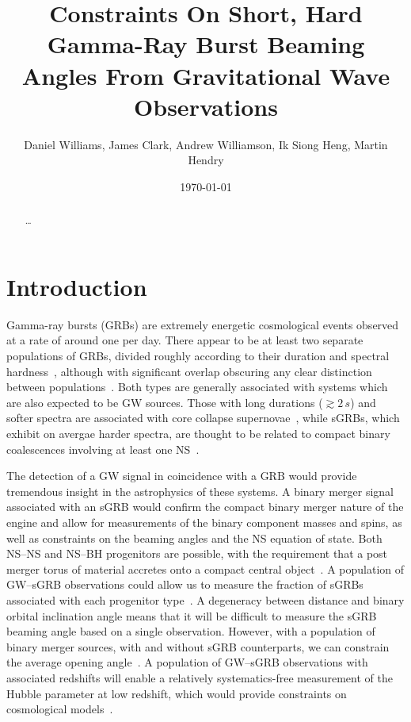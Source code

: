 \documentclass[twocolumn,nofootinbib]{revtex4-1}
\newcommand{\BNS}{\ac{NS}--\ac{NS}\xspace}
\newcommand{\NSBH}{\ac{NS}--\ac{BH}\xspace}
\newcommand{\JOINT}{\ac{GW}--\ac{sGRB}\xspace}
\begin{document}
\title{Constraints On Short, Hard Gamma-Ray Burst Beaming Angles From
Gravitational Wave Observations}
\author{Daniel Williams, James Clark, Andrew Williamson, Ik Siong Heng, Martin Hendry}
\date{\today}

\begin{abstract}
\dots
\end{abstract}

\maketitle

\section{Introduction}
Gamma-ray bursts (GRBs) are extremely energetic
cosmological events observed at a rate of around one per day.  There
appear to be at least two separate populations of \acp{GRB}, divided
roughly according to their duration and spectral
hardness~\cite{Kouveliotou:1993yx}, although with significant overlap
obscuring any clear distinction between
populations~\cite{Zhang:2009uf,Bromberg:2012gp}.  Both types are
generally associated with systems which are also expected to be
\ac{GW} sources.  Those with long durations ($\gtrsim 2\,s$) and
softer spectra are associated with core collapse
supernovae~\cite{Galama:1998ea,MacFadyen:1998vz,Woosley:2006fn}, while
\acp{sGRB}, which exhibit on avergae harder spectra, are thought to be
related to compact binary coalescences involving at least one
\ac{NS}~\cite{Eichler:1989ve,Paczynski:1991aq,Narayan:1992iy,Lee:2007js}.

The detection of a \ac{GW} signal in coincidence with a \ac{GRB} would
provide tremendous insight in the astrophysics of these systems.  A
binary merger signal associated with an \ac{sGRB} would confirm the
compact binary merger nature of the engine and allow for measurements
of the binary component masses and spins, as well as constraints on
the beaming angles and the \ac{NS} equation of state.  Both \BNS and
\NSBH progenitors are possible, with the requirement that a post
merger torus of material accretes onto a compact central
object~\cite{Blandford:1977ds,Rosswog:2002rt,Giacomazzo:2012zt}.  A
population of \JOINT observations could allow us to measure the
fraction of \acp{sGRB} associated with each progenitor
type~\cite{Kreidberg:2012ud}.  A degeneracy between distance and
binary orbital inclination angle means that it will be difficult to
measure the \ac{sGRB} beaming angle based on a single observation.
However, with a population of binary merger sources, with and without
\ac{sGRB} counterparts, we can constrain the average opening
angle~\cite{Clark:2014jpa}.  A population of \JOINT observations with
associated redshifts will enable a relatively systematics-free
measurement of the Hubble parameter at low redshift, which would
provide constraints on cosmological
models~\cite{Schutz:1986gp,Chen:2012qh}.
\end{document}
